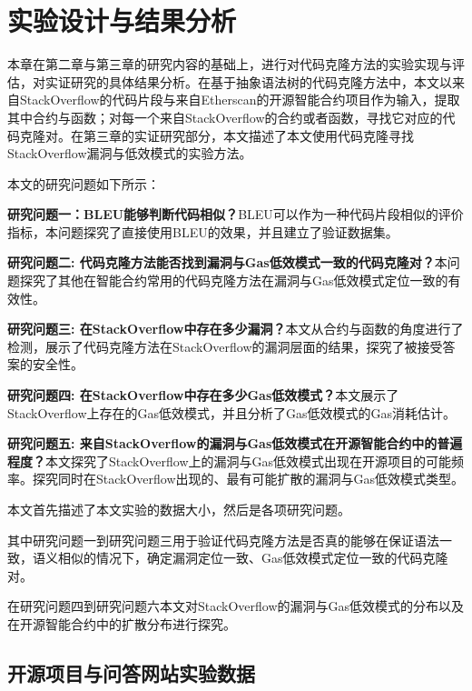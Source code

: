 
\chapter{实验设计与结果分析}

本章在第二章与第三章的研究内容的基础上，进行对代码克隆方法的实验实现与评估，对实证研究的具体结果分析。在基于抽象语法树的代码克隆方法中，本文以来自StackOverflow的代码片段与来自Etherscan的开源智能合约项目作为输入，提取其中合约与函数；对每一个来自StackOverflow的合约或者函数，寻找它对应的代码克隆对。在第三章的实证研究部分，本文描述了本文使用代码克隆寻找StackOverflow漏洞与低效模式的实验方法。

本文的研究问题如下所示：

 \textbf{研究问题一：BLEU能够判断代码相似？}BLEU可以作为一种代码片段相似的评价指标，本问题探究了直接使用BLEU的效果，并且建立了验证数据集。

\textbf{研究问题二: 代码克隆方法能否找到漏洞与Gas低效模式一致的代码克隆对？}本问题探究了其他在智能合约常用的代码克隆方法在漏洞与Gas低效模式定位一致的有效性。


\textbf{研究问题三: 在StackOverflow中存在多少漏洞？}本文从合约与函数的角度进行了检测，展示了代码克隆方法在StackOverflow的漏洞层面的结果，探究了被接受答案的安全性。

\textbf{研究问题四: 在StackOverflow中存在多少Gas低效模式？}本文展示了StackOverflow上存在的Gas低效模式，并且分析了Gas低效模式的Gas消耗估计。

\textbf{研究问题五: 来自StackOverflow的漏洞与Gas低效模式在开源智能合约中的普遍程度？}本文探究了StackOverflow上的漏洞与Gas低效模式出现在开源项目的可能频率。探究同时在StackOverflow出现的、最有可能扩散的漏洞与Gas低效模式类型。

本文首先描述了本文实验的数据大小，然后是各项研究问题。

其中研究问题一到研究问题三用于验证代码克隆方法是否真的能够在保证语法一致，语义相似的情况下，确定漏洞定位一致、Gas低效模式定位一致的代码克隆对。

在研究问题四到研究问题六本文对StackOverflow的漏洞与Gas低效模式的分布以及在开源智能合约中的扩散分布进行探究。

\section{开源项目与问答网站实验数据}

